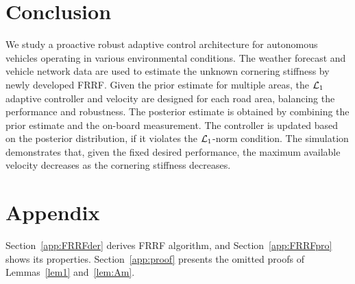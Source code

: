 \documentclass[letterpaper, 10 pt, conference]{ieeeconf}
\begin{document}
\section{Conclusion}
We study a proactive robust adaptive control architecture for autonomous vehicles operating in various environmental conditions.
The weather forecast and vehicle network data are used to estimate the unknown cornering stiffness by newly developed FRRF. Given the prior estimate for multiple areas, the $\mathcal{L}_1$ adaptive controller and velocity are designed for each road area, balancing the performance and robustness.
The posterior estimate is obtained by combining the prior estimate and the on-board measurement. The controller is updated based on the posterior distribution, if it violates the $\mathcal{L}_1$-norm condition. The simulation demonstrates that, given the fixed desired performance, the maximum available velocity decreases as the cornering stiffness decreases.




\section{Appendix}

Section~\ref{app:FRRFder} derives FRRF algorithm, and Section~\ref{app:FRRFpro} shows its properties. Section~\ref{app:proof} presents the omitted proofs of Lemmas~\ref{lem1} and~\ref{lem:Am}.
\end{document}

